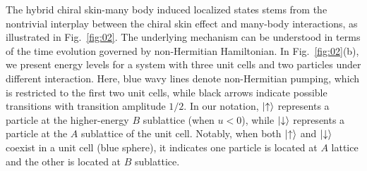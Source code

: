\documentclass[longbibliography, aps, prx, amsmath, amssymb, amsfonts, twocolumn,superscriptaddress, footinbib]{revtex4-1}
\begin{document}



	The hybrid chiral skin-many body induced localized states stems from the nontrivial interplay between the chiral skin effect and many-body interactions, as illustrated in Fig.~\ref{fig:02}. The underlying mechanism can be understood in terms of the time evolution governed by non-Hermitian Hamiltonian. 
	In Fig.~\ref{fig:02}(b), we present energy levels for a system with three unit cells and two particles under different interaction. Here, blue wavy lines denote non-Hermitian pumping, which is restricted to the first two unit cells, while black arrows indicate possible transitions with transition amplitude $1/2$. 
	In our notation, $\ket{\uparrow}$ represents a particle at the higher-energy $B$ sublattice (when $u<0$), while $\ket{\downarrow}$ represents a particle at the $A$ sublattice of the unit cell.
	Notably, when both $\ket{\uparrow}$ and $\ket{\downarrow}$ coexist in a unit cell (blue sphere), it indicates one particle is located at $A$ lattice and the other is located at $B$ sublattice.
	
\end{document}
